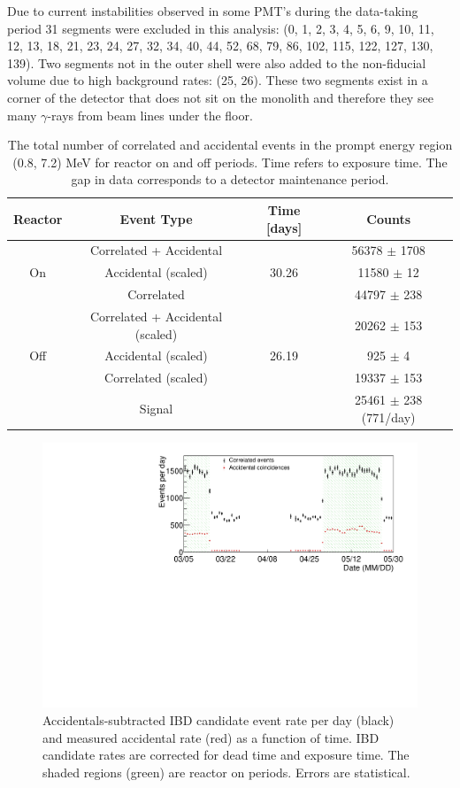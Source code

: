 Due to current instabilities observed in some PMT's during the data-taking period 31 segments were excluded in this analysis: (0, 1, 2, 3, 4, 5, 6, 9, 10, 11, 12, 13, 18, 21, 23, 24, 27, 32, 34, 40, 44, 52, 68, 79, 86, 102, 115, 122, 127, 130, 139).
Two segments not in the outer shell were also added to the non-fiducial volume due to high background rates: (25, 26).
These two segments exist in a corner of the detector that does not sit on the monolith and therefore they see many $\gamma$-rays from beam lines under the floor.

\begin{table}[H]
\begin{tabular}{|c|c|c|c|}
	\hline 
	\textbf{Reactor} & \textbf{Event Type} & \textbf{Time [days]} & \textbf{Counts} \\ 
	\hline 
	& Correlated + Accidental &  & 56378 $\pm$ 1708 \\ 
	On & Accidental (scaled) & 30.26 & 11580 $\pm$ 12 \\ 
	& Correlated &  & 44797 $\pm$ 238 \\ 
	\hline 
	& Correlated + Accidental (scaled) & & 20262 $\pm$ 153   \\ 
	Off &  Accidental (scaled) & 26.19  & 925 $\pm$ 4   \\ 
	& Correlated (scaled) & & 19337 $\pm$ 153 \\ 
	\hline 
	\hline 
	& Signal &  & 25461 $\pm$ 238 (771/day) \\ 
	\hline 
\end{tabular} 
\caption{The total number of correlated and accidental events in the prompt energy region (0.8, 7.2) MeV for reactor on and off periods. Time refers to exposure time. The gap in data corresponds to a detector maintenance period.}
\label{tab:datastats}
\end{table}

\begin{figure}[H]
	\centering
	\includegraphics[width=0.7\linewidth]{tex/7-oscillation-images/EvtRates}
	\caption{Accidentals-subtracted IBD candidate event rate per day (black) and measured accidental rate (red) as a function of time. IBD candidate rates are corrected for dead time and exposure time. The shaded regions (green) are reactor on periods. Errors are statistical.}
	\label{fig:evtrates}
\end{figure}


